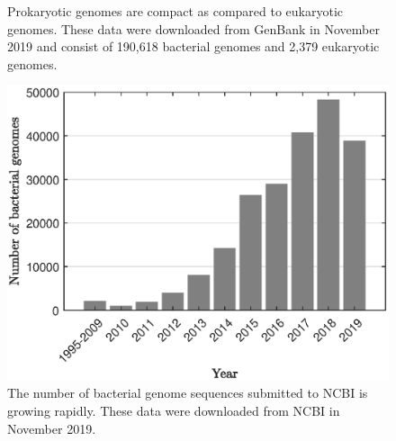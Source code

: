\begin{figure}[t]
\begin{subfigure}[t]{0.45\textwidth}
    \end{subfigure}\hfill
    \caption[Prokaryotic genomes are compact as compared to eukaryotic genomes.]{Prokaryotic genomes are compact as compared to eukaryotic genomes. These data were downloaded from GenBank in November 2019 and consist of 190,618 bacterial genomes and 2,379 eukaryotic genomes.}
    \label{fig:compact}
\end{figure}
\begin{figure}[t]
    \centering
         \includegraphics[scale=0.7]{bacseq}
         \caption[The number of bacterial genome sequences submitted to NCBI is growing rapidly.]{The number of bacterial genome sequences submitted to NCBI is growing rapidly. These data were downloaded from NCBI in November 2019.}
         \label{fig:seqgenomes}
\end{figure}
